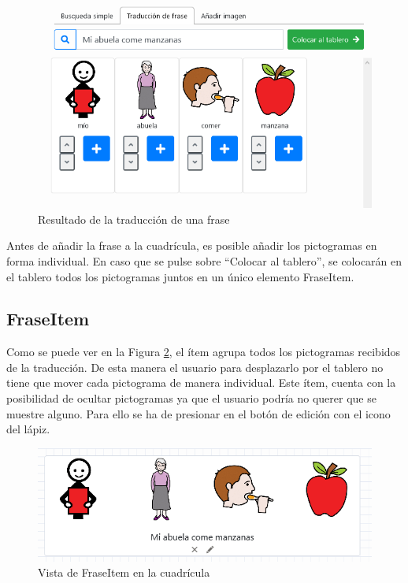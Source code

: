 \begin{figure}[h!]
	\centering
	\includegraphics[width=0.7\linewidth]{Imagenes/Bitmap/traduccionPicto}
	\caption{Resultado de la traducción de una frase}
	\label{fig:traduccionpicto}
\end{figure}


Antes de añadir la frase a la cuadrícula, es posible añadir los pictogramas en forma individual. En caso que se pulse sobre “Colocar al tablero”, se colocarán en el tablero todos los pictogramas juntos en un único elemento FraseItem. 

\subsection{FraseItem}

Como se puede ver en la Figura \ref{fig:fraseitemoriginal}, el ítem agrupa todos los pictogramas recibidos de la traducción. De esta manera el usuario para desplazarlo por el tablero no tiene que mover cada pictograma de manera individual. Este ítem, cuenta con la posibilidad de ocultar pictogramas ya que el usuario podría no querer que se muestre alguno. Para ello se ha de presionar en el botón de edición con el icono del lápiz. 

\begin{figure}[h!]
	\centering
	\includegraphics[width=0.7\linewidth]{Imagenes/Bitmap/fraseItemOriginal}
	\caption{Vista de FraseItem en la cuadrícula}
	\label{fig:fraseitemoriginal}
\end{figure}


